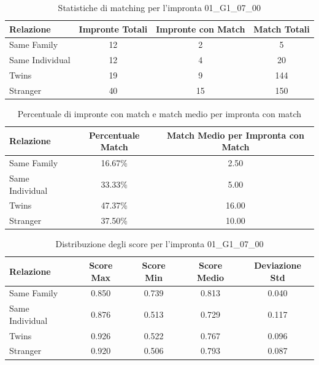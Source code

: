 \begin{table}[htbp]
\centering
\caption{Statistiche di matching per l'impronta 01\_G1\_07\_00}
\label{tab:results_01_G1_07_00}
\begin{tabular}{|l|c|c|c|}
\hline
\textbf{Relazione} & \textbf{Impronte Totali} & \textbf{Impronte con Match} & \textbf{Match Totali} \\
\hline
Same Family & 12 & 2 & 5 \\
\hline
Same Individual & 12 & 4 & 20 \\
\hline
Twins & 19 & 9 & 144 \\
\hline
Stranger & 40 & 15 & 150 \\
\hline
\end{tabular}
\end{table}


\begin{table}[htbp]
\centering
\caption{Percentuale di impronte con match e match medio per impronta con match}
\label{tab:match_percentage_01_G1_07_00}
\begin{tabular}{|l|c|c|}
\hline
\textbf{Relazione} & \textbf{Percentuale Match} & \textbf{Match Medio per Impronta con Match} \\
\hline
Same Family & 16.67\% & 2.50 \\
\hline
Same Individual & 33.33\% & 5.00 \\
\hline
Twins & 47.37\% & 16.00 \\
\hline
Stranger & 37.50\% & 10.00 \\
\hline
\end{tabular}
\end{table}


\begin{table}[htbp]
\centering
\caption{Distribuzione degli score per l'impronta 01\_G1\_07\_00}
\label{tab:scores_01_G1_07_00}
\begin{tabular}{|l|c|c|c|c|}
\hline
\textbf{Relazione} & \textbf{Score Max} & \textbf{Score Min} & \textbf{Score Medio} & \textbf{Deviazione Std} \\
\hline
Same Family & 0.850 & 0.739 & 0.813 & 0.040 \\
\hline
Same Individual & 0.876 & 0.513 & 0.729 & 0.117 \\
\hline
Twins & 0.926 & 0.522 & 0.767 & 0.096 \\
\hline
Stranger & 0.920 & 0.506 & 0.793 & 0.087 \\
\hline
\end{tabular}
\end{table}

